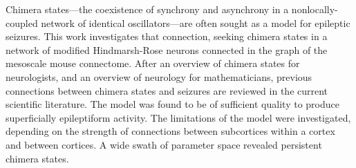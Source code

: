 Chimera states---the coexistence of synchrony and asynchrony in a nonlocally-coupled network of identical oscillators---are often sought as a model for epileptic seizures.
This work investigates that connection, seeking chimera states in a network of modified Hindmarsh-Rose neurons connected in the graph of the mesoscale mouse connectome.
After an overview of chimera states for neurologists,
and an overview of neurology for mathematicians,
previous connections between chimera states and seizures are reviewed in the current scientific literature.
The model was found to be of sufficient quality to produce superficially epileptiform activity.
The limitations of the model were investigated, depending on the strength of connections between subcortices within a cortex and between cortices.
A wide swath of parameter space revealed persistent chimera states.

